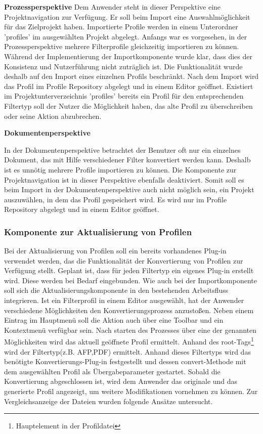 {{{\textbf{Prozessperspektive}
 {Dem Anwender steht in dieser Perspektive eine Projektnavigation zur Verfügung. Er soll beim Import eine Auswahlmöglichkeit für das Zielprojekt haben. Importierte Profile werden in einem Unterordner 'profiles' im ausgewählten Projekt abgelegt. Anfangs war es vorgesehen, in der Prozessperspektive mehrere Filterprofile gleichzeitig importieren zu können. Während der Implementierung der Importkomponente wurde klar, dass dies der Konsistenz und Nutzerführung nicht zuträglich ist. Die Funktionalität wurde deshalb auf den Import eines einzelnen Profils beschränkt. Nach dem Import wird das Profil im Profile Repository abgelegt und in einem Editor geöffnet. Existiert im Projektunterverzeichnis 'profiles' bereits ein Profil für den entsprechenden Filtertyp soll der Nutzer die Möglichkeit haben, das alte Profil zu überschreiben oder seine Aktion abzubrechen. 
}


\textbf{Dokumentenperspektive} 
{In der Dokumentenperspektive betrachtet der Benutzer oft nur ein einzelnes Dokument, das mit Hilfe verschiedener Filter konvertiert werden kann. Deshalb ist es unnötig mehrere Profile importieren zu können. Die Komponente zur Projektnavigation ist in dieser Perspektive ebenfalls deaktiviert. Somit soll es beim Import in der Dokumentenperspektive auch nicht möglich sein, ein Projekt auszuwählen, in dem das Profil gespeichert wird. Es wird nur im Profile Repository abgelegt und in einem Editor geöffnet.


}



}

\subsubsection{Komponente zur Aktualisierung von Profilen}{
Bei der Aktualisierung von Profilen soll ein bereits vorhandenes Plug-in verwendet werden, das die Funktionalität der Konvertierung von Profilen zur Verfügung stellt. Geplant ist, dass für jeden Filtertyp ein eigenes Plug-in erstellt wird. Diese werden bei Bedarf eingebunden. Wie auch bei der Importkomponente soll sich die Aktualisierungskomponente in den bestehenden Arbeitsfluss integrieren. Ist ein Filterprofil in einem Editor ausgewählt, hat der Anwender verschiedene Möglichkeiten den Konvertierungsprozess anzustoßen. Neben einem Eintrag im Hauptmenü soll die Aktion auch über eine \gls{Toolbar} und ein Kontextmenü verfügbar sein. Nach starten des Prozesses über eine der genannten Möglichkeiten wird das aktuell geöffnete Profil ermittelt. Anhand des root-Tags\footnote{Hauptelement in der Profildatei} wird der Filtertyp(z.B. \ac{AFP},\ac{PDF}) ermittelt. Anhand dieses Filtertyps wird das benötigte Konvertierungs-Plug-in festgestellt und dessen convert-Methode mit dem ausgewählten Profil als Übergabeparameter gestartet. Sobald die Konvertierung abgeschlossen ist, wird dem Anwender das originale und das generierte Profil angezeigt, um weitere Modifikationen vornehmen zu können. Zur Vergleichsanzeige der Dateien wurden folgende Ansätze untersucht.

}}}
